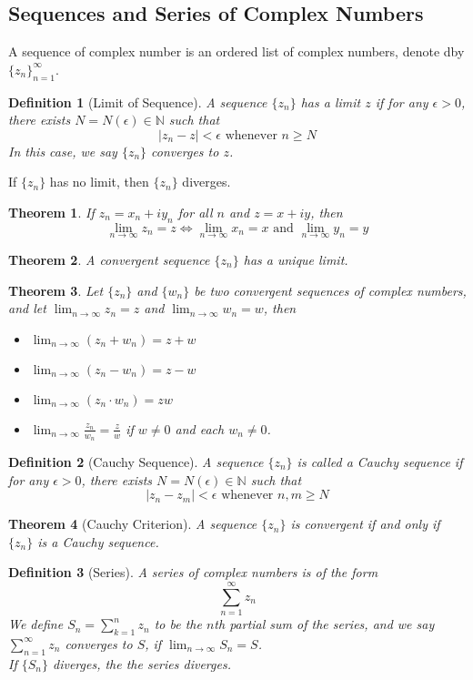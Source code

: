 \documentclass[12pt]{article}
\newtheorem{definition}{Definition}[section]
\newtheorem{theorem}{Theorem}[section]
\theoremstyle{definition}
\begin{document}
\subsection{Sequences and Series of Complex Numbers}
A sequence of complex number is an ordered list of complex numbers, denote dby $\{z_n\}_{n=1}^\infty$.
\begin{definition}[Limit of Sequence]
\normalfont A sequence $\{z_n\}$ has a limit $z$ if for any $\epsilon>0$, there exists $N=N(\epsilon)\in \mathbb{N}$ such that
\[
|z_n-z|< \epsilon \text{ whenever }n\geq N
\]
In this case, we say $\{z_n\}$ converges to $z$.
\end{definition}
If $\{z_n\}$ has no limit, then $\{z_n\}$ diverges.
\begin{theorem}\normalfont If $z_n = x_n + iy_n$ for all $n$ and $z=x+iy$, then
\[
\lim_{n\to\infty}z_n = z \Leftrightarrow \lim_{n\to\infty} x_n = x \text{ and }\lim_{n\to\infty} y_n = y
\]
\end{theorem}
\begin{theorem}\normalfont A convergent sequence $\{z_n\}$ has a unique limit.
\end{theorem}
\begin{theorem}\normalfont Let $\{z_n\}$ and $\{w_n\}$ be two convergent sequences of complex numbers, and let $\lim_{n\to\infty} z_n = z$ and $\lim_{n\to\infty} w_n = w$, then 
\begin{itemize}
	\item $\lim_{n\to\infty}(z_n + w_n) = z+w$
	\item $\lim_{n\to\infty}(z_n - w_n) = z-w$
	\item $\lim_{n\to\infty}(z_n\cdot w_n) = zw$
	\item $\lim_{n\to\infty}\frac{z_n}{w_n}=\frac{z}{w}$ if $w\neq 0$ and each $w_n\neq 0$.
\end{itemize}
\end{theorem}
\begin{definition}[Cauchy Sequence]
\normalfont A sequence $\{z_n\}$ is called a Cauchy sequence if for any $\epsilon>0$, there exists $N=N(\epsilon)\in \mathbb{N}$ such that
\[
|z_n - z_m|<\epsilon\text{ whenever }n, m \geq N
\]
\end{definition}
\begin{theorem}[Cauchy Criterion]
\normalfont A sequence $\{z_n\}$ is convergent if and only if $\{z_n\}$ is a Cauchy sequence.
\end{theorem}
\begin{definition}[Series]
\normalfont A series of complex numbers is of the form
\[
\sum_{n=1}^\infty z_n
\]
We define $S_n = \sum_{k=1}^n z_n$ to be the $n$th partial sum of the series, and we say $\sum_{n=1}^\infty z_n$ converges to $S$, if  $\lim_{n\to\infty}S_n = S$.\\
If $\{S_n\}$ diverges, the the series diverges.
\end{definition}
\end{document}
